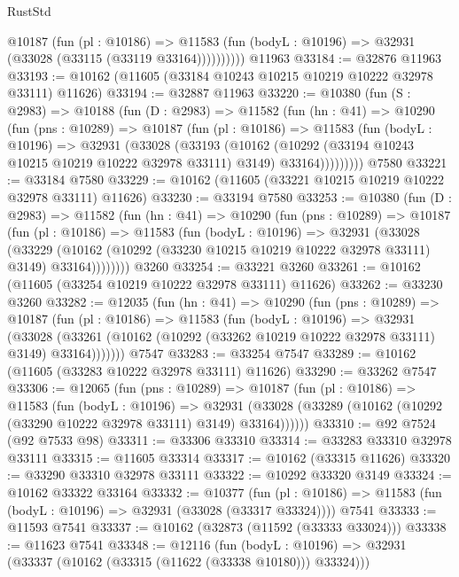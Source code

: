 \begin{lexlean}{RustStd}
\begin{coremodule}
            @10187
              (fun (pl : @10186) =>
              @11583 (fun (bodyL : @10196) => @32931 (@33028 (@33115 (@33119 @33164))))))))))
    @11963
@33184 := @32876 @11963
@33193 := @10162 (@11605 (@33184 @10243 @10215 @10219 @10222 @32978 @33111) @11626)
@33194 := @32887 @11963
@33220 := @10380
    (fun (S : @2983) =>
    @10188
      (fun (D : @2983) =>
      @11582
        (fun (hn : @41) =>
        @10290
          (fun (pns : @10289) =>
          @10187
            (fun (pl : @10186) =>
            @11583
              (fun (bodyL : @10196) =>
              @32931
                (@33028
                  (@33193
                    (@10162
                      (@10292 (@33194 @10243 @10215 @10219 @10222 @32978 @33111) @3149)
                      @33164)))))))))
    @7580
@33221 := @33184 @7580
@33229 := @10162 (@11605 (@33221 @10215 @10219 @10222 @32978 @33111) @11626)
@33230 := @33194 @7580
@33253 := @10380
    (fun (D : @2983) =>
    @11582
      (fun (hn : @41) =>
      @10290
        (fun (pns : @10289) =>
        @10187
          (fun (pl : @10186) =>
          @11583
            (fun (bodyL : @10196) =>
            @32931
              (@33028
                (@33229
                  (@10162 (@10292 (@33230 @10215 @10219 @10222 @32978 @33111) @3149) @33164))))))))
    @3260
@33254 := @33221 @3260
@33261 := @10162 (@11605 (@33254 @10219 @10222 @32978 @33111) @11626)
@33262 := @33230 @3260
@33282 := @12035
    (fun (hn : @41) =>
    @10290
      (fun (pns : @10289) =>
      @10187
        (fun (pl : @10186) =>
        @11583
          (fun (bodyL : @10196) =>
          @32931
            (@33028
              (@33261 (@10162 (@10292 (@33262 @10219 @10222 @32978 @33111) @3149) @33164)))))))
    @7547
@33283 := @33254 @7547
@33289 := @10162 (@11605 (@33283 @10222 @32978 @33111) @11626)
@33290 := @33262 @7547
@33306 := @12065
    (fun (pns : @10289) =>
    @10187
      (fun (pl : @10186) =>
      @11583
        (fun (bodyL : @10196) =>
        @32931 (@33028 (@33289 (@10162 (@10292 (@33290 @10222 @32978 @33111) @3149) @33164))))))
@33310 := @92 @7524 (@92 @7533 @98)
@33311 := @33306 @33310
@33314 := @33283 @33310 @32978 @33111
@33315 := @11605 @33314
@33317 := @10162 (@33315 @11626)
@33320 := @33290 @33310 @32978 @33111
@33322 := @10292 @33320 @3149
@33324 := @10162 @33322 @33164
@33332 := @10377
    (fun (pl : @10186) => @11583 (fun (bodyL : @10196) => @32931 (@33028 (@33317 @33324))))
    @7541
@33333 := @11593 @7541
@33337 := @10162 (@32873 (@11592 (@33333 @33024)))
@33338 := @11623 @7541
@33348 := @12116
    (fun (bodyL : @10196) => @32931 (@33337 (@10162 (@33315 (@11622 (@33338 @10180))) @33324)))

\end{coremodule}
\end{lexlean}
